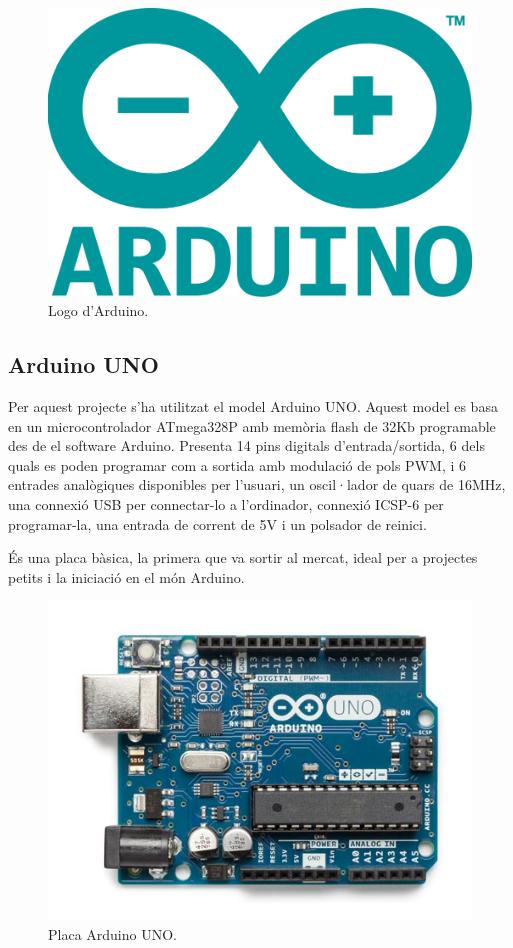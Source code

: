 \begin{figure}[H]
	\centering
	\includegraphics[scale=0.1]{arduino-logo.png}
	\caption{Logo d'Arduino.}
	\label{fig:arduinologo}
\end{figure}

\subsection{Arduino UNO}

Per aquest projecte s’ha utilitzat el model Arduino UNO. Aquest model  es basa en un microcontrolador ATmega328P amb memòria flash de 32Kb programable des de el software Arduino. Presenta 14 pins digitals d’entrada/sortida, 6 dels quals es poden programar com a sortida amb modulació de pols PWM, i 6 entrades analògiques disponibles per l’usuari, un oscil·lador de quars de 16MHz, una connexió USB per connectar-lo a l’ordinador, connexió ICSP-6 per programar-la, una entrada de corrent de 5V i un polsador de reinici. 

És una placa bàsica, la primera que va sortir al mercat, ideal per a projectes petits i la iniciació en el món Arduino.

\begin{figure}[H]
	\centering
	\includegraphics[scale=0.5]{arduino-uno.png}
	\caption{Placa Arduino UNO.}
	\label{fig:arduinouno}
\end{figure}


